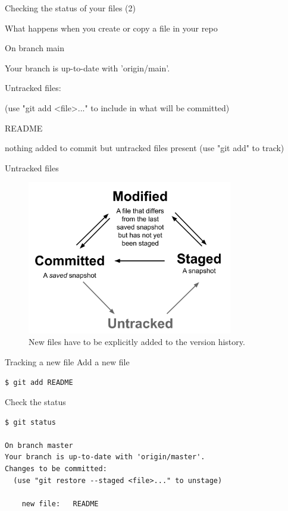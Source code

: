 \documentclass[handout]{beamer}
\begin{document}
\begin{frame}{Checking the status of your files (2)}
	\begin{exampleblock}{What happens when you create or copy a file in your repo}
		\begin{semiverbatim}
			\item On branch main
			\item Your branch is up-to-date with 'origin/main'.
			\item Untracked files:
			\item (use "git add <file>..." to include in what will be committed)
			\item README
			\item nothing added to commit but untracked files present (use "git add" to track)
		\end{semiverbatim}
	\end{exampleblock}
\end{frame}

\begin{frame}{Untracked files}
	\begin{figure}
		\includegraphics[width=0.8\textwidth]{figures/git_4states.pdf}
		\caption{New files have to be explicitly added to the version history.}
	\end{figure}
\end{frame}

\begin{frame}[fragile]{Tracking a new file}
Add a new file
\begin{lstlisting}
$ git add README    
\end{lstlisting}
Check the status 
\begin{lstlisting}
$ git status

On branch master
Your branch is up-to-date with 'origin/master'.
Changes to be committed:
  (use "git restore --staged <file>..." to unstage)

    new file:   README
\end{lstlisting}
\end{frame}
\end{document}
